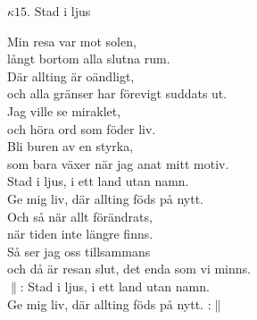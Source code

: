 \documentclass[a6paper,10pt]{article}
\begin{document}
\setlength{\oddsidemargin}{-0.47in}
\noindent
\begin{center}
\Large $\kappa15$. Stad i ljus \\
\end{center}
Min resa var mot solen, \\
långt bortom alla slutna rum. \\
Där allting är oändligt, \\
och alla gränser har förevigt suddats ut.
\vspace{5pt} \\
Jag ville se miraklet, \\
och höra ord som föder liv. \\
Bli buren av en styrka, \\ 
som bara växer när jag anat mitt motiv.
\vspace{5pt} \\
Stad i ljus, i ett land utan namn. \\
Ge mig liv, där allting föds på nytt.
\vspace{5pt} \\
Och så när allt förändrats, \\
när tiden inte längre finns. \\
Så ser jag oss tillsammans \\
och då är resan slut, det enda som vi minns.
\vspace{5pt} \\
$\|$: Stad i ljus, i ett land utan namn. \\
Ge mig liv, där allting föds på nytt. :$\|$
\end{document}
